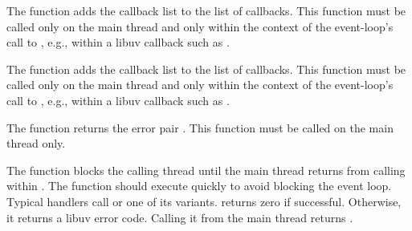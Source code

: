 \begin{function}
\end{function}

The  function adds the callback list
 to the list of
callbacks.
This function must be called only on the main thread and only within the
context of the event-loop's call to , e.g., within a
libuv callback such as .

\begin{function}
\end{function}

The  function adds the callback list
 to the list
of callbacks.
This function must be called only on the main thread and only within the
context of the event-loop's call to , e.g., within a
libuv callback such as .

\begin{function}
\end{function}

The  function returns the error pair
. This function must be called on the
main thread only.

\begin{function}
\end{function}

The  function blocks the calling thread until
the main thread returns from calling
 within .
The  function should execute quickly to avoid blocking
the event loop. Typical handlers call 
or one of its variants.  returns zero if
successful.  Otherwise, it returns a libuv error code. Calling it from
the main thread returns .

